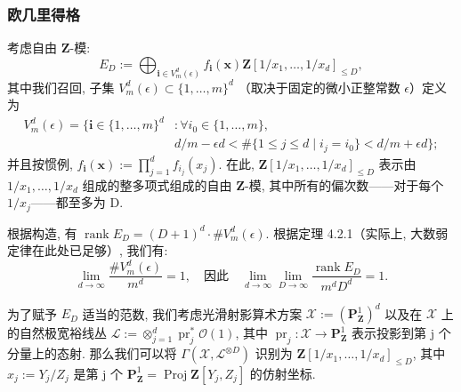 \subsubsection{欧几里得格}\label{sec:8.2.1}

考虑自由 \(\mathbf{Z}\)-模:
\begin{equation}\label{eq:8.2.2}
E_D := \bigoplus_{\mathbf{i} \in V_m^d(\epsilon)} f_{\mathbf{i}}(\mathbf{x}) \mathbf{Z}[1/x_1, \dots, 1/x_d]_{\leq D},
\end{equation}
其中我们召回, 子集 \(V_m^d(\epsilon) \subset \{1, \dots, m\}^d\) （取决于固定的微小正整常数 \(\epsilon\)）定义为
\[
\begin{aligned}
V_m^d(\epsilon) = \Big\{ \mathbf{i} \in \{1, \dots, m\}^d &: \forall i_0 \in \{1, \dots, m\}, \\
& d/m - \epsilon d < \#\{1 \le j \le d \mid i_j = i_0\} < d/m + \epsilon d \Big\};
\end{aligned}
\]
并且按惯例, \(f_{\mathbf{i}}(\mathbf{x}) := \prod_{j=1}^d f_{i_j}(x_j)\). 
在此, \(\mathbf{Z}[1/x_1, \dots, 1/x_d]_{\leq D}\) 表示由 \(1/x_1, \dots, 1/x_d\) 组成的整多项式组成的自由 \(\mathbf{Z}\)-模, 
其中所有的偏次数——对于每个 \(1/x_j\)——都至多为 D.

根据构造, 有 \(\operatorname{rank} E_D = (D+1)^d \cdot \#V_m^d(\epsilon)\). 
根据定理 4.2.1（实际上, 大数弱定律在此处已足够）, 我们有:
\[ \lim_{d\to\infty} \frac{\#V_m^d(\epsilon)}{m^d} = 1, \quad \text{因此} \quad \lim_{d\to\infty} \lim_{D\to\infty} \frac{\operatorname{rank} E_D}{m^d D^d} = 1. \]

为了赋予 \(E_D\) 适当的范数, 我们考虑光滑射影算术方案 \(\mathcal{X} := (\mathbf{P}_{\mathbf{Z}}^1)^d\) 
以及在 \(\mathcal{X}\) 上的自然极宽裕线丛 \(\mathcal{L} := \otimes_{j=1}^d \operatorname{pr}_j^* \mathcal{O}(1)\), 
其中 \(\operatorname{pr}_j : \mathcal{X} \to \mathbf{P}_{\mathbf{Z}}^1\) 表示投影到第 j 个分量上的态射. 
那么我们可以将 \(\Gamma(\mathcal{X}, \mathcal{L}^{\otimes D})\) 识别为 \(\mathbf{Z}[1/x_1, \ldots, 1/x_d]_{\leq D}\), 
其中 \(x_j := Y_j/Z_j\) 是第 j 个 \(\mathbf{P}_{\mathbf{Z}}^1 = \operatorname{Proj} \mathbf{Z}[Y_j, Z_j]\) 的仿射坐标.

